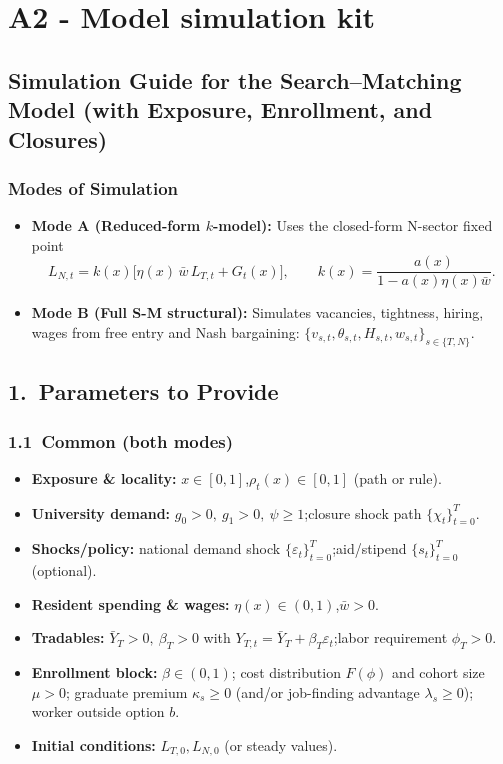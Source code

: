\section*{ A2 - Model simulation kit}

\subsection*{Simulation Guide for the Search--Matching Model (with Exposure, Enrollment, and Closures)}

\subsubsection*{Modes of Simulation}
\begin{itemize}
	\item \textbf{Mode A (Reduced-form $k$-model):} Uses the closed-form N-sector fixed point
	\[
	L_{N,t}=k(x)\big[\eta(x)\,\bar w\,L_{T,t}+G_t(x)\big],\qquad
	k(x)=\frac{a(x)}{1-a(x)\eta(x)\bar w}.
	\]
	\item \textbf{Mode B (Full S-M structural):} Simulates vacancies, tightness, hiring, wages from free entry and Nash bargaining:
	\(
	\{v_{s,t},\theta_{s,t},H_{s,t},w_{s,t}\}_{s\in\{T,N\}}.
	\)
\end{itemize}

\subsection*{1.\ Parameters to Provide}

\subsubsection*{1.1\ Common (both modes)}
\begin{itemize}
	\item \textbf{Exposure \& locality:} $x\in[0,1]$,\quad $\rho_t(x)\in[0,1]$ (path or rule).
	\item \textbf{University demand:} $g_0>0,\ g_1>0,\ \psi\ge 1$;\quad closure shock path $\{\chi_t\}_{t=0}^T$.
	\item \textbf{Shocks/policy:} national demand shock $\{\varepsilon_t\}_{t=0}^T$;\quad aid/stipend $\{s_t\}_{t=0}^T$ (optional).
	\item \textbf{Resident spending \& wages:} $\eta(x)\in(0,1)$,\quad $\bar w>0$.
	\item \textbf{Tradables:} $\bar Y_T>0,\ \beta_T>0$ with $Y_{T,t}=\bar Y_T+\beta_T\varepsilon_t$;\quad labor requirement $\phi_T>0$.
	\item \textbf{Enrollment block:} $\beta\in(0,1)$; cost distribution $F(\phi)$ and cohort size $\mu>0$; graduate premium $\kappa_s\ge 0$ (and/or job-finding advantage $\lambda_s\ge 0$); worker outside option $b$.
	\item \textbf{Initial conditions:} $L_{T,0},L_{N,0}$ (or steady values).
\end{itemize}

